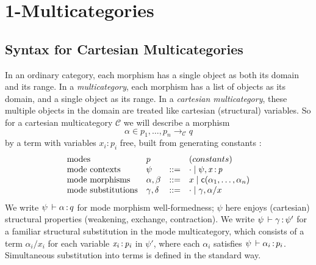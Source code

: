 
\newcommand\mor[3]{\ensuremath{#2} \longrightarrow_#1 #3}
\newcommand\C{\ensuremath{\mathcal{C}}}
\newcommand\D{\ensuremath{\mathcal{D}}}
\newcommand\E{\ensuremath{\mathcal{E}}}
\newcommand\deq{\ensuremath{\equiv}}
\newcommand\seq[3]{\ensuremath{#1 \vdash_{#2} #3}}
\newcommand\F[2]{\ensuremath{\dsd{F}_{#1}(#2)}}
\newcommand\U[3]{\ensuremath{\dsd{U}_{#1}(#2 \mid #3)}}
\newcommand\Fsymb[0]{\dsd{F}}
\newcommand\Usymb[0]{\dsd{U}}
\newcommand\tsubst[2]{\ensuremath{#1[#2]}}
\renewcommand\subst[3]{\ensuremath{#1[#2/#3]}}
\newcommand\wftype[2]{\ensuremath{#1 \: \dsd{type}_{#2}}}
\renewcommand\wfctx[2]{\ensuremath{#1 \: \dsd{ctx}_{#2}}}
\newcommand\modeof[1]{\ensuremath{\hat{#1}}}
\newcommand\many[1]{\ensuremath{\overline{#1}}}
\renewcommand{\oftp}[3]{\ensuremath{#1 \, \vdash #2 \, \dcd{:} \, #3}}
\newcommand\FL{\dsd{FL}}
\newcommand\FR{\dsd{FR}}
\newcommand\UL{\dsd{UL}}
\newcommand\UR{\dsd{UR}}

\section{1-Multicategories}

\subsection{Syntax for Cartesian Multicategories}
In an ordinary category, each morphism has a single object as both its
domain and its range.  In a \emph{multicategory}, each morphism has a
list of objects as its domain, and a single object as its range.  In a
\emph{cartesian multicategory}, these multiple objects in the domain are
treated like cartesian (structural) variables. So for a cartesian
multicategory \C\/ we will describe a morphism
\[
\alpha \in \mor{\C}{p_1,\ldots,p_n}{q}
\]
by a term with variables $x_i:p_i$ free, built from generating constants
:
\[
\begin{array}{llll}
\text{modes} & p & & (constants) \\
\text{mode contexts} & \psi & ::= & \cdot \mid \psi,\mathit{x} \, \mathit{:} \, \mathit{p} \\
\text{mode morphisms} & \alpha,\beta & ::= & x \mid \mathsf{c}(\alpha_1,\ldots,\alpha_n) \\
\text{mode substitutions} & \gamma,\delta & ::= & \cdot \mid \gamma,\alpha/x\\
\end{array}
\]
We write $\oftp{\psi}{\alpha}{q}$ for mode morphism well-formedness;
$\psi$ here enjoys (cartesian) structural properties (weakening,
exchange, contraction).  We write $\oftp{\psi}{\gamma}{\psi'}$ for a
familiar structural substitution in the mode multicategory, which
consists of a term $\alpha_i/x_i$ for each variable $\mathit{x_i} \, \mathit{:} \, \mathit{p_i}$ in
$\psi'$, where each $\alpha_i$ satisfies $\oftp{\psi}{\alpha_i}{p_i}$.
Simultaneous substitution into terms is defined in the standard way.

